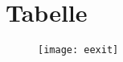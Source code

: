 \section{Tabelle}
\begin{frame}

  
  \begin{figure}[h]
    \centering
    \texttt{[image: eexit]}
  \end{figure}

\end{frame}
